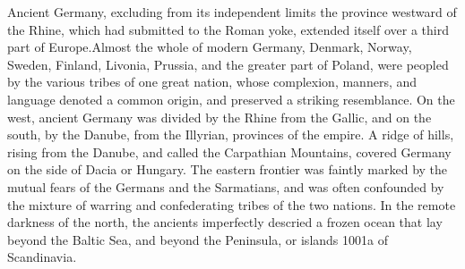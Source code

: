 Ancient Germany, excluding from its independent limits the
province westward of the Rhine, which had submitted to the Roman
yoke, extended itself over a third part of Europe.\footnotemark[1] Almost the
whole of modern Germany, Denmark, Norway, Sweden, Finland,
Livonia, Prussia, and the greater part of Poland, were peopled by
the various tribes of one great nation, whose complexion,
manners, and language denoted a common origin, and preserved a
striking resemblance. On the west, ancient Germany was divided by
the Rhine from the Gallic, and on the south, by the Danube, from
the Illyrian, provinces of the empire. A ridge of hills, rising
from the Danube, and called the Carpathian Mountains, covered
Germany on the side of Dacia or Hungary. The eastern frontier was
faintly marked by the mutual fears of the Germans and the
Sarmatians, and was often confounded by the mixture of warring
and confederating tribes of the two nations. In the remote
darkness of the north, the ancients imperfectly descried a frozen
ocean that lay beyond the Baltic Sea, and beyond the Peninsula,
or islands 1001a of Scandinavia.

